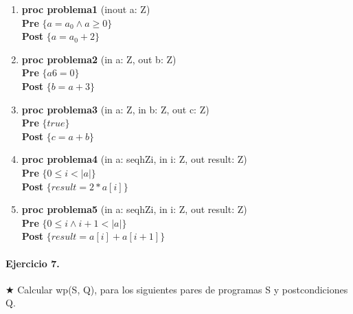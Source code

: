 \documentclass[a4paper]{article}
\begin{document}
\begin{enumerate}[label=\alph*)]
\item \textbf{proc problema1 }(inout a: Z) {\\
   \hspace*{6mm} \textbf{Pre }$\{a = a_0 \wedge a \geq 0\}$\\
   \hspace*{6mm} \textbf{Post }$\{a = a_0 + 2\}$\\
   }

\item \textbf{proc problema2 }(in a: Z, out b: Z) {\\
   \hspace*{6mm} \textbf{Pre }$\{a 6= 0\}$\\
   \hspace*{6mm} \textbf{Post }$\{b = a + 3\}$\\
   }

\item \textbf{proc problema3 }(in a: Z, in b: Z, out c: Z) {\\
   \hspace*{6mm} \textbf{Pre }$\{true\}$\\
   \hspace*{6mm} \textbf{Post }$\{c = a + b\}$\\
   }

\item \textbf{proc problema4 }(in a: seqhZi, in i: Z, out result: Z) {\\
   \hspace*{6mm} \textbf{Pre }$\{0 \leq i < |a|\}$\\
   \hspace*{6mm} \textbf{Post }$\{result = 2 * a[i]\}$\\
   }

\item \textbf{proc problema5 }(in a: seqhZi, in i: Z, out result: Z) {\\
   \hspace*{6mm} \textbf{Pre }$\{0 \leq i \wedge i + 1 < |a|\}$\\
   \hspace*{6mm} \textbf{Post }$\{result = a[i] + a[i + 1]\}$\\
   }
\end{enumerate}

                                                            
\paragraph{Ejercicio 7.} $\bigstar$ Calcular wp(S, Q), para los siguientes pares de programas S y postcondiciones Q.
\end{document}
